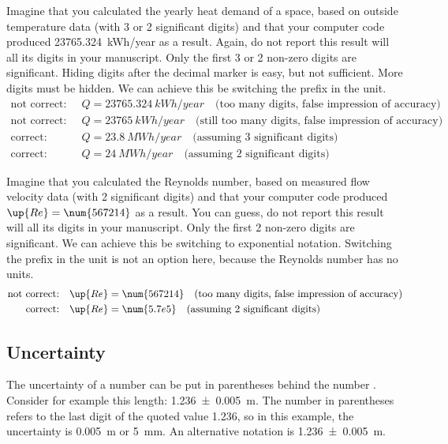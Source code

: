 Imagine that you calculated the yearly heat demand of a space, based on outside temperature data (with 3 or 2 significant digits) and that your computer code produced \qty{23765.324}{kWh/year} as a result. Again, do not report this result will all its digits in your manuscript. Only the first 3 or 2 non-zero digits are significant. Hiding digits after the decimal marker is easy, but not sufficient. More digits must be hidden. We can achieve this be switching the prefix in the unit.  
\begin{align*}
    \text{not correct:} \quad & Q = \qty{23765.324}{kWh/year} \quad \text{(too many digits, false impression of accuracy)} \\
    \text{not correct:} \quad & Q = \qty{23765}{kWh/year} \quad \text{(still too many digits, false impression of accuracy)} \\
    \text{correct:}     \quad & Q = \qty{23.8}{MWh/year} \quad \text{(assuming 3 significant digits)}\\
    \text{correct:}     \quad & Q = \qty{24}{MWh/year} \quad \text{(assuming 2 significant digits)} 
\end{align*}

Imagine that you calculated the Reynolds number, based on measured flow velocity data (with 2 significant digits) and that your computer code produced $\up{Re}=\num{567214}$ as a result. You can guess, do not report this result will all its digits in your manuscript. Only the first 2 non-zero digits are significant. We can achieve this be switching to exponential notation. Switching the prefix in the unit is not an option here, because the Reynolds number has no units. 
\begin{align*}
    \text{not correct:} \quad & \up{Re} = \num{567214} \quad \text{(too many digits, false impression of accuracy)} \\
    \text{correct:}     \quad & \up{Re} = \num{5.7e5} \quad \text{(assuming 2 significant digits)} 
\end{align*}

\subsection{Uncertainty}
The uncertainty of a number can be put in parentheses behind the number \parencite[section 5.4.5]{SI}. Consider for example this length: \qty{1.236(5)}{\m}. The number in parentheses refers to the last digit of the quoted value 1.236, so in this example, the uncertainty is \qty{0.005}{\m} or \qty{5}{\mm}. An alternative notation is \qty[separate-uncertainty=true]{1.236(5)}{\m}.


